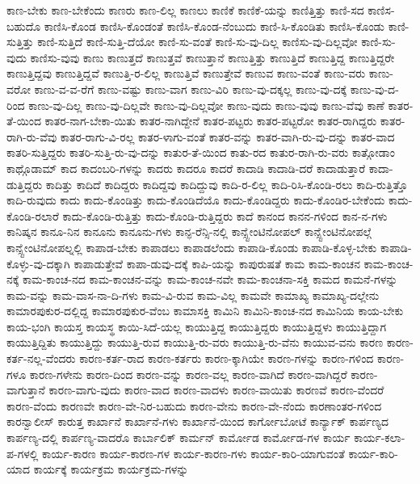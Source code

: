 {ಕಾಣ-ಬೇಕು
ಕಾಣ-ಬೇಕೆಂದು
ಕಾಣರು
ಕಾಣ-ಲಿಲ್ಲ
ಕಾಣಲು
ಕಾಣಿಕೆ
ಕಾಣಿಕೆ-ಯನ್ನು
ಕಾಣಿತ್ತಿತ್ತು
ಕಾಣಿ-ಸದ
ಕಾಣಿಸ-ಬಹುದೊ
ಕಾಣಿಸಿ-ಕೊಂಡ
ಕಾಣಿಸಿ-ಕೊಂಡಂತೆ
ಕಾಣಿಸಿ-ಕೊಂಡ-ನೆಂಬುದು
ಕಾಣಿ-ಸಿ-ಕೊಂಡಿತು
ಕಾಣಿಸಿ-ಕೊಂಡು
ಕಾಣಿ-ಸುತ್ತಿತ್ತು
ಕಾಣಿ-ಸುತ್ತಿದೆ
ಕಾಣಿ-ಸುತ್ತಿ-ದೆಯೋ
ಕಾಣಿ-ಸು-ವಂತೆ
ಕಾಣಿ-ಸು-ವು-ದಿಲ್ಲ
ಕಾಣಿಸು-ವು-ದಿಲ್ಲವೋ
ಕಾಣಿ-ಸು-ವುದು
ಕಾಣಿಸು-ವುವು
ಕಾಣು
ಕಾಣುತ್ತದೆ
ಕಾಣುತ್ತವೆ
ಕಾಣುತ್ತಾನೆ
ಕಾಣುತ್ತಿತ್ತು
ಕಾಣುತ್ತಿದೆ
ಕಾಣುತ್ತಿದ್ದ
ಕಾಣುತ್ತಿದ್ದರೇ
ಕಾಣುತ್ತಿದ್ದವು
ಕಾಣುತ್ತಿದ್ದವೆ
ಕಾಣುತ್ತಿ-ರ-ಲಿಲ್ಲ
ಕಾಣುತ್ತಿವೆ
ಕಾಣುತ್ತೇವೆ
ಕಾಣುವ
ಕಾಣು-ವಂತೆ
ಕಾಣು-ವರು
ಕಾಣು-ವರೋ
ಕಾಣು-ವ-ವ-ರೆಗೆ
ಕಾಣು-ವಷ್ಟು
ಕಾಣು-ವಾಗ
ಕಾಣು-ವಿರಿ
ಕಾಣು-ವು-ದಕ್ಕಲ್ಲ
ಕಾಣು-ವು-ದಕ್ಕೆ
ಕಾಣು-ವು-ದ-ರಿಂದ
ಕಾಣು-ವು-ದಿಲ್ಲ
ಕಾಣು-ವು-ದಿಲ್ಲವೇ
ಕಾಣು-ವು-ದಿಲ್ಲವೋ
ಕಾಣು-ವುದು
ಕಾಣು-ವುವು
ಕಾಣು-ವೆವು
ಕಾಣೆ
ಕಾತರ-ತೆ-ಯಿಂದ
ಕಾತರ-ನಾಗ-ಬೇಕಾ-ಯಿತು
ಕಾತರ-ನಾಗಿದ್ದೇನೆ
ಕಾತರ-ಪಟ್ಟರು
ಕಾತರ-ಪಟ್ಟರೋ
ಕಾತರ-ರಾಗಿದ್ದರು
ಕಾತರ-ರಾಗಿ-ರು-ವೆವು
ಕಾತರ-ರಾಗು-ವಿ-ರಲ್ಲ
ಕಾತರ-ಳಾಗು-ವಂತೆ
ಕಾತರ-ವನ್ನು
ಕಾತರ-ವಾಗಿ-ರು-ವು-ದನ್ನು
ಕಾತರ-ವಾದ
ಕಾತರಿ-ಸುತ್ತಿದ್ದರು
ಕಾತರಿ-ಸುತ್ತಿ-ರು-ವು-ದನ್ನು
ಕಾತುರ-ತೆ-ಯಿಂದ
ಕಾತು-ರದ
ಕಾತುರ-ರಾಗಿ-ರು-ವರು
ಕಾತ್ಗೋಡಾಂ
ಕಾಥ್ಗೊಡಾಮ್
ಕಾದ
ಕಾದಂಬರಿ-ಗಳನ್ನು
ಕಾದರು
ಕಾದರೂ
ಕಾದರೆ
ಕಾದಾಡಿ
ಕಾದಾಡಿ-ದರೆ
ಕಾದಾಡುತ್ತಾರೆ
ಕಾದಾ-ಡುತ್ತಿದ್ದರು
ಕಾದಿತ್ತು
ಕಾದಿದೆ
ಕಾದಿದ್ದರು
ಕಾದಿದ್ದವು
ಕಾದಿದ್ದುವು
ಕಾದಿ-ರ-ಲಿಲ್ಲ
ಕಾದಿ-ರಿಸಿ-ಕೊಂಡಿ-ರಲು
ಕಾದಿ-ರುತ್ತಿತ್ತೊ
ಕಾದಿ-ರುವುದು
ಕಾದು
ಕಾದು-ಕೊಂಡಿತ್ತು
ಕಾದು-ಕೊಂಡಿದೆಯೊ
ಕಾದು-ಕೊಂಡಿದ್ದರು
ಕಾದು-ಕೊಂಡಿರ-ಬೇಕೆಂದು
ಕಾದು-ಕೊಂಡಿ-ರಲಾರೆ
ಕಾದು-ಕೊಂಡಿ-ರುತ್ತಿತ್ತು
ಕಾದು-ಕೊಂಡಿ-ರುತ್ತಿದ್ದರು
ಕಾದೆ
ಕಾನಂದ
ಕಾನನ-ಗಳಿಂದ
ಕಾನ-ನ-ಗಳು
ಕಾನಿಷ್ಕನ
ಕಾನೂ-ನಿನ
ಕಾನೂನು
ಕಾನೂನು-ಗಳು
ಕಾನ್ಫ-ರೆನ್ಸಿ-ನಲ್ಲಿ
ಕಾನ್ಸ್ಟೇಂಟಿನೋಪಲ್
ಕಾನ್ಸ್ಟೇಂಟಿನೋಪಲ್ಗೆ
ಕಾನ್ಸ್ಟೇಂಟಿನೋಪಲ್ನಲ್ಲಿ
ಕಾಪಾಡ-ಬೇಕು
ಕಾಪಾಡಲು
ಕಾಪಾಡಲೆಂದು
ಕಾಪಾಡಿ-ಕೊಂಡು
ಕಾಪಾಡಿ-ಕೊಳ್ಳ-ಬೇಕು
ಕಾಪಾಡಿ-ಕೊಳ್ಳು-ವು-ದಕ್ಕಾಗಿ
ಕಾಪಾಡುತ್ತೇವೆ
ಕಾಪಾ-ಡುವು-ದಕ್ಕೆ
ಕಾಪಿ-ಯನ್ನು
ಕಾಪುರುಷತೆ
ಕಾಮ
ಕಾಮ-ಕಾಂಚನ
ಕಾಮ-ಕಾಂಚ-ನಕ್ಕೆ
ಕಾಮ-ಕಾಂಚ-ನದ
ಕಾಮ-ಕಾಂಚನ-ವನ್ನು
ಕಾಮ-ಕಾಂಚ-ನವೇ
ಕಾಮ-ಕಾಂಚನಾ-ಸಕ್ತಿ
ಕಾಮದ
ಕಾಮನೆ-ಗಳನ್ನು
ಕಾಮ-ವನ್ನು
ಕಾಮ-ವಾಸ-ನಾ-ದಿ-ಗಳು
ಕಾಮ-ವಿ-ರುವ
ಕಾಮ-ವಿಲ್ಲ
ಕಾಮವೇ
ಕಾಮಾಖ್ಯ
ಕಾಮಾಖ್ಯ-ದಲ್ಲೇನು
ಕಾಮಾರಪುಕುರ-ದಲ್ಲಿದ್ದ
ಕಾಮಾರಪುಕುರ-ವೆಂಬ
ಕಾಮಾಸಕ್ತಿ
ಕಾಮಿನಿ
ಕಾಮಿನಿ-ಕಾಂಚ-ನದ
ಕಾಮಿನಿಯ
ಕಾಯ-ಬೇಕು
ಕಾಯ-ಭಂಗಿ
ಕಾಯಸ್ತ
ಕಾಯಸ್ಥ
ಕಾಯಿ-ಸಿದೆ-ಯಲ್ಲ
ಕಾಯುತ್ತಿದ್ದ
ಕಾಯುತ್ತಿದ್ದರು
ಕಾಯುತ್ತಿದ್ದಳು
ಕಾಯುತ್ತಿದ್ದಾಗ
ಕಾಯುತ್ತಿದ್ದಿತು
ಕಾಯುತ್ತಿದ್ದು
ಕಾಯುತ್ತಿ-ರುವ
ಕಾಯುತ್ತಿ-ರು-ವರು
ಕಾಯುತ್ತಿ-ರು-ವೆನು
ಕಾಯುವ-ವನು
ಕಾರಣ
ಕಾರಣ-ಕರ್ತ-ನಲ್ಲ-ವೆಂದರು
ಕಾರಣ-ಕರ್ತ-ರಾದ
ಕಾರಣ-ಕರ್ತರು
ಕಾರಣ-ಕ್ಕಾಗಿಯೇ
ಕಾರಣ-ಗಳನ್ನು
ಕಾರಣ-ಗಳಿಂದ
ಕಾರಣ-ಗಳೂ
ಕಾರಣ-ಗಳೇನು
ಕಾರಣ-ದಿಂದ
ಕಾರಣ-ವನ್ನು
ಕಾರಣ-ವಲ್ಲ
ಕಾರಣ-ವಾಗಿದೆ
ಕಾರಣ-ವಾಗಿದ್ದರೆ
ಕಾರಣ-ವಾಗುತ್ತಾನೆ
ಕಾರಣ-ವಾಗು-ವುದು
ಕಾರಣ-ವಾದ
ಕಾರಣ-ವಾದಳು
ಕಾರಣ-ವಾಯಿತು
ಕಾರಣವೆ
ಕಾರಣ-ವೆಂದರೆ
ಕಾರಣ-ವೆಂದು
ಕಾರಣವೇ
ಕಾರಣ-ವೇ-ನಿರ-ಬಹುದು
ಕಾರಣ-ವೇನು
ಕಾರಣ-ವೇ-ನೆಂದು
ಕಾರಣಾಂತರ-ಗಳಿಂದ
ಕಾರನ್ವಾಲೀಸ್
ಕಾರುತ್ತ
ಕಾರ್ಖಾನೆ
ಕಾರ್ಖಾನೆ-ಗಳು
ಕಾರ್ಖಾನೆ-ಯಿಂದ
ಕಾರ್ಗೋಬೋಟೆ
ಕಾರ್ನ್ಯಾಕ್
ಕಾರ್ಪಣ್ಯದ
ಕಾರ್ಪಣ್ಯ-ದಲ್ಲಿ
ಕಾರ್ಪಣ್ಯ-ವಾದರೊ
ಕಾರ್ಬಾಲಿಕ್
ಕಾರ್ಮನ್
ಕಾರ್ಮೋಡ
ಕಾರ್ಮೋಡ-ಗಳ
ಕಾರ್ಯ
ಕಾರ್ಯ-ಕಲಾ-ಪ-ಗಳಲ್ಲಿ
ಕಾರ್ಯ-ಕಾರಣ
ಕಾರ್ಯ-ಕಾರಣ-ಗಳ
ಕಾರ್ಯ-ಕಾರಣ-ಗಳು
ಕಾರ್ಯ-ಕಾರಿ-ಯಾಗುವಂತೆ
ಕಾರ್ಯ-ಕಾರಿ-ಯಾದ
ಕಾರ್ಯಕ್ಕೆ
ಕಾರ್ಯಕ್ರಮ
ಕಾರ್ಯಕ್ರಮ-ಗಳನ್ನು
}
